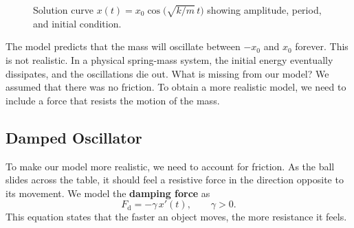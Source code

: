 \documentclass[11pt,letterpaper]{article}
\begin{document}
\begin{figure}[H]
\centering
{}
\caption{Solution curve $x(t)=x_0\cos\!\bigl(\sqrt{k/m}\,t\bigr)$ showing amplitude, period, and initial condition.}
\end{figure}

The model predicts that the mass will oscillate between $-x_0$ and $x_0$ forever. This is not realistic. In a physical spring-mass system, the initial energy eventually dissipates, and the oscillations die out. What is missing from our model? We assumed that there was no friction. To obtain a more realistic model, we need to include a force that resists the motion of the mass.

\subsection{Damped Oscillator}
To make our model more realistic, we need to account for friction. As the ball slides across the table, it should feel a resistive force in the direction opposite to its movement. We model the \textbf{damping force} as
\[
F_{\text{d}} = -\gamma\,x'(t),
\qquad \gamma>0.
\]
This equation states that the faster an object moves, the more resistance it feels.
\end{document}
